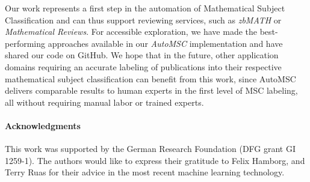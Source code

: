 Our work represents a first step in the automation of Mathematical Subject Classification and can thus support reviewing services, such as \emph{zbMATH} or \emph{Mathematical Reviews}.
For accessible exploration, we have made the best-performing approaches available in our \emph{AutoMSC} implementation and have shared our code on GitHub.
We hope that in the future, other application domains requiring an accurate labeling of publications into their respective mathematical subject classification can benefit from this work, since AutoMSC delivers comparable results to human experts in the first level of MSC labeling, all without requiring manual labor or trained experts.

\paragraph{Acknowledgments} This work was supported by the German Research Foundation (DFG grant GI 1259-1).
The authors would like to express their gratitude to Felix Hamborg, and Terry Ruas for their advice in the most recent machine learning technology.
\printbibliography[keyword=primary]
